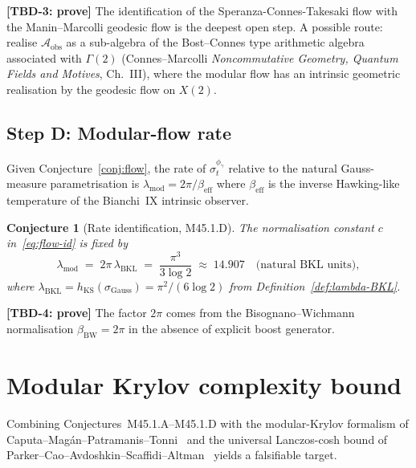 \documentclass[12pt,a4paper]{article}
\newtheorem{conjecture}{Conjecture}
\begin{document}
\noindent\textbf{[TBD-3: prove]} The identification of the
Speranza-Connes-Takesaki flow with the Manin--Marcolli geodesic flow
is the deepest open step. A possible route: realise
$\mathcal{A}_{\mathrm{obs}}$ as a sub-algebra of the Bost--Connes type
arithmetic algebra associated with $\Gamma(2)$ (Connes--Marcolli
\emph{Noncommutative Geometry, Quantum Fields and Motives}, Ch.~III),
where the modular flow has an intrinsic geometric realisation by the
geodesic flow on $X(2)$.

\subsection{Step D: Modular-flow rate}\label{ssec:rate}

Given Conjecture~\ref{conj:flow}, the rate of $\sigma_t^{\phi_\gamma}$
relative to the natural Gauss-measure parametrisation is
$\lambda_{\mathrm{mod}} = 2\pi/\beta_{\mathrm{eff}}$ where
$\beta_{\mathrm{eff}}$ is the inverse Hawking-like temperature of the
Bianchi~IX intrinsic observer.

\begin{conjecture}[Rate identification, M45.1.D]\label{conj:rate}
The normalisation constant $c$ in~\eqref{eq:flow-id} is fixed by
\begin{equation}
  \lambda_{\mathrm{mod}} \;=\; 2\pi\,\lambda_{\mathrm{BKL}}
  \;=\; \frac{\pi^3}{3\log 2}
  \;\approx\; 14.907\quad\text{(natural BKL units)},
  \label{eq:rate}
\end{equation}
where $\lambda_{\mathrm{BKL}} = h_{\mathrm{KS}}(\sigma_{\mathrm{Gauss}})
= \pi^2/(6\log 2)$ from Definition~\ref{def:lambda-BKL}.
\end{conjecture}

\noindent\textbf{[TBD-4: prove]} The factor $2\pi$ comes from the
Bisognano--Wichmann normalisation $\beta_{\mathrm{BW}}=2\pi$ in the
absence of explicit boost generator.

\section{Modular Krylov complexity bound}\label{sec:bound}

Combining Conjectures~M45.1.A--M45.1.D with the modular-Krylov
formalism of Caputa--Mag\'{a}n--Patramanis--Tonni~\cite{Caputa2023} and
the universal Lanczos-cosh bound of
Parker--Cao--Avdoshkin--Scaffidi--Altman~\cite{Parker2019} yields a
falsifiable target.
\end{document}
